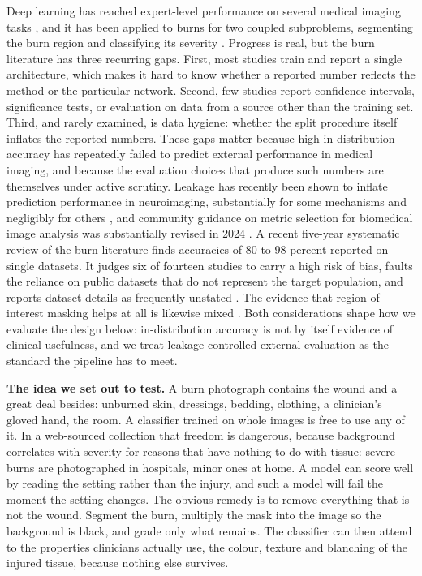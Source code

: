 \documentclass{melba}
\begin{document}
Deep learning has reached expert-level performance on several medical imaging tasks \citep{esteva,litjens}, and it has been applied to burns for two coupled subproblems, segmenting the burn region and classifying its severity \citep{boissin}. Progress is real, but the burn literature has three recurring gaps. First, most studies train and report a single architecture, which makes it hard to know whether a reported number reflects the method or the particular network. Second, few studies report confidence intervals, significance tests, or evaluation on data from a source other than the training set. Third, and rarely examined, is data hygiene: whether the split procedure itself inflates the reported numbers. These gaps matter because high in-distribution accuracy has repeatedly failed to predict external performance in medical imaging, and because the evaluation choices that produce such numbers are themselves under active scrutiny. Leakage has recently been shown to inflate prediction performance in neuroimaging, substantially for some mechanisms and negligibly for others \citep{rosenblatt2024}, and community guidance on metric selection for biomedical image analysis was substantially revised in 2024 \citep{metricsreloaded}. A recent five-year systematic review of the burn literature finds accuracies of 80 to 98 percent reported on single datasets. It judges six of fourteen studies to carry a high risk of bias, faults the reliance on public datasets that do not represent the target population, and reports dataset details as frequently unstated \citep{fu2026review}. The evidence that region-of-interest masking helps at all is likewise mixed \citep{sourget}. Both considerations shape how we evaluate the design below: in-distribution accuracy is not by itself evidence of clinical usefulness, and we treat leakage-controlled external evaluation as the standard the pipeline has to meet.

\textbf{The idea we set out to test.} A burn photograph contains the wound and a great deal besides: unburned skin, dressings, bedding, clothing, a clinician's gloved hand, the room. A classifier trained on whole images is free to use any of it. In a web-sourced collection that freedom is dangerous, because background correlates with severity for reasons that have nothing to do with tissue: severe burns are photographed in hospitals, minor ones at home. A model can score well by reading the setting rather than the injury, and such a model will fail the moment the setting changes. The obvious remedy is to remove everything that is not the wound. Segment the burn, multiply the mask into the image so the background is black, and grade only what remains. The classifier can then attend to the properties clinicians actually use, the colour, texture and blanching of the injured tissue, because nothing else survives.
\end{document}
